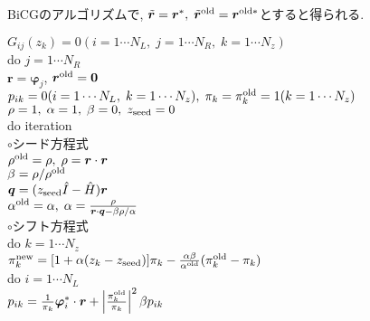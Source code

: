 \documentclass[12pt,titlepage]{jarticle}
\begin{document}
BiCGのアルゴリズムで, ${\tilde {\boldsymbol r}} = {\boldsymbol r}^*,\; 
{\tilde {\boldsymbol r}}^{\rm old} = {\boldsymbol r}^{{\rm old}*}$とすると得られる.

\noindent
$G_{i j}(z_k) = 0 (i=1 \cdots N_L,\; j = 1 \cdots N_R,\; k=1 \cdots N_z)$
\\
do $j = 1 \cdots N_R$
\\\hspace{0.5cm}
${\boldsymbol r} = {\boldsymbol \varphi_j}$, 
${\boldsymbol r}^{\rm old} = {\bf 0}$
\\\hspace{0.5cm}
$p_{i k} = 0(i=1 \cdots N_L,\; k=1 \cdots N_z),\; \pi_k=\pi_k^{\rm old} = 1(k=1 \cdots N_z)$ 
\\\hspace{0.5cm}
$\rho = 1,\; \alpha = 1,\; \beta=0,\; z_{\rm seed}=0$ 
\\\hspace{0.5cm}
do iteration
\\\hspace{1.0cm}
$\circ$シード方程式
\\\hspace{1.0cm}
$\rho^{\rm old} = \rho,\; \rho = {\boldsymbol r} \cdot {\boldsymbol r}$
\\\hspace{1.0cm}
$\beta = \rho / \rho^{\rm old}$
\\\hspace{1.0cm}
${\boldsymbol q} = (z_{\rm seed} {\hat I} - {\hat H}){\boldsymbol r}$
\\\hspace{1.0cm}
$\alpha^{\rm old} = \alpha,\; 
\alpha = \frac{\rho}{{\boldsymbol r}\cdot{\boldsymbol q} - \beta \rho / \alpha }$
\\\hspace{1.0cm}
$\circ$シフト方程式
\\\hspace{1.0cm}
do $k = 1 \cdots N_z$
\\\hspace{1.5cm}
$\pi_k^{\rm new} = [1+\alpha(z_k-z_{\rm seed})]\pi_k - \frac{\alpha \beta}{\alpha^{\rm old}}(\pi_k^{\rm old} - \pi_k)$
\\\hspace{1.5cm}
do $i = 1 \cdots N_L$
\\\hspace{2.0cm}
$p_{i k} = \frac{1}{\pi_k} {\boldsymbol \varphi}_i^* \cdot {\boldsymbol r} + 
\left|\frac{\pi^{\rm old}_k}{\pi_k } \right|^2 \beta p_{i k}$
\\\hspace{2.0cm}
\end{document}
